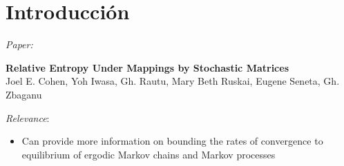\section{Introducción}
\noindent \textit{Paper:}
\begin{center}
    \textbf{Relative Entropy Under Mappings by Stochastic Matrices} \\
    Joel E. Cohen, Yoh Iwasa, Gh. Rautu, Mary Beth Ruskai, Eugene Seneta, Gh. Zbaganu
\end{center}
\noindent \textit{Relevance}: 
\begin{itemize}
    \item Can provide more information on bounding the rates of convergence to equilibrium of ergodic Markov chains and Markov processes 
\end{itemize}